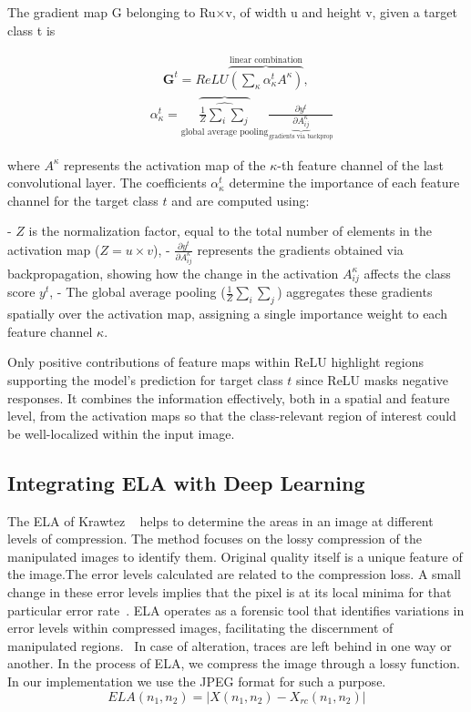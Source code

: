 \documentclass{ieeeaccess}
\begin{document}
The gradient map G belonging to Ru×v, of width u and height v, given a target class t is

\begin{align*}&\quad \displaystyle \mathbf{G}^{t}=ReLU\overbrace{\left(\sum\limits_{\kappa}\alpha_{\kappa}^{t}A^{\kappa}\right)}^{\text{linear combination}}, \tag{2}\\ & \alpha_{\kappa}^{t}= \overbrace{\hat{\frac{1}{Z}\sum_{i}\sum_{j}}}_{\text{global average pooling}} \frac{\partial y^{t}}{\underbrace{\partial A_{ij}^{\kappa}}_{\text{gradients via backprop}}} \tag{3} \end{align*}

where \( A^{\kappa} \) represents the activation map of the \(\kappa\)-th feature channel of the last convolutional layer. The coefficients \( \alpha_{\kappa}^{t} \) determine the importance of each feature channel for the target class \( t \) and are computed using:

- \( Z \) is the normalization factor, equal to the total number of elements in the activation map (\( Z = u \times v \)),
- \( \frac{\partial y^{t}}{\partial A_{ij}^{\kappa}} \) represents the gradients obtained via backpropagation, showing how the change in the activation \( A_{ij}^{\kappa} \) affects the class score \( y^{t} \),
- The global average pooling (\( \frac{1}{Z} \sum_{i} \sum_{j} \)) aggregates these gradients spatially over the activation map, assigning a single importance weight to each feature channel \( \kappa \).

Only positive contributions of feature maps within ReLU highlight regions supporting the model's prediction for target class \( t \) since ReLU masks negative responses. It combines the information effectively, both in a spatial and feature level, from the activation maps so that the class-relevant region of interest could be well-localized within the input image.

\subsection{Integrating ELA with Deep Learning}
The ELA of Krawtez ~\cite{krawtez2007pictures} helps to determine the areas in an image at different levels of compression. The method focuses on the lossy compression of the manipulated images to identify them. Original quality itself is a unique feature of the image.The error levels calculated are related to the compression loss. A small change in these error levels implies that the pixel is at its local minima for that particular error rate~\cite{ghai2024deep}.
 ELA operates as a forensic tool that identifies variations in error levels within compressed images, facilitating the discernment of manipulated regions.~\cite{10627878} In case of alteration, traces are left behind in one way or another. In the process of ELA, we compress the image through a lossy function. In our implementation we use the JPEG format for such a purpose.
\begin{equation}
	ELA(n_1, n_2) = \left| X(n_1, n_2) - X_{rc}(n_1, n_2) \right| \tag{4}
\end{equation}
\end{document}
